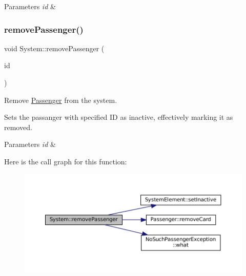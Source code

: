 \begin{DoxyParams}{Parameters}
{\em id} & \\
\hline
\end{DoxyParams}
\mbox{\label{classSystem_a95041a0cbce21f64feb99d437a7b340d}} 
\subsubsection{\texorpdfstring{remove\+Passenger()}{removePassenger()}}
{\footnotesize\ttfamily void System\+::remove\+Passenger (\begin{DoxyParamCaption}\item[{\mbox{\hyperlink{project__utils_8h_a8f3a969054ad2200720b96e7e23dd4e1}{id\+\_\+t}}}]{id }\end{DoxyParamCaption})}



Remove \mbox{\hyperlink{classPassenger}{Passenger}} from the system. 

Sets the passanger with specified ID as inactive, effectively marking it as removed.


\begin{DoxyParams}{Parameters}
{\em id} & \\
\hline
\end{DoxyParams}
Here is the call graph for this function\+:
\nopagebreak
\begin{figure}[H]
\begin{center}
\leavevmode
\includegraphics[width=350pt]{classSystem_a95041a0cbce21f64feb99d437a7b340d_cgraph}
\end{center}
\end{figure}
\mbox{\label{classSystem_aaf63fe98c16bc79b2e91c3555afd9446}} 

